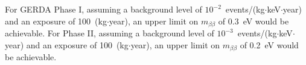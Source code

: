 For GERDA Phase I, assuming a background level of $10^{-2}$~events/(kg$\cdot$keV$\cdot$year) and an exposure of
100~(kg$\cdot$year), an upper limit on $m_{\beta\beta}$ of
0.3~eV would be achievable. For Phase II, assuming a background level of $10^{-3}$~events/(kg$\cdot$keV$\cdot$year) and an exposure of
100~(kg$\cdot$year), an upper limit on $m_{\beta\beta}$ of
0.2~eV would be achievable.


